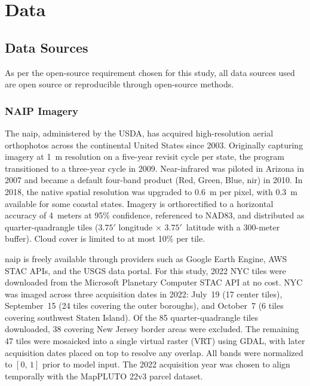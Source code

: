 \chapter{Data}
\label{ch:data}

\section{Data Sources}
\label{sec:data_sources}

As per the open-source requirement chosen for this study, all data sources used are open source or reproducible through open-source methods.

\subsection{NAIP Imagery}
\label{sec:naip}

The \acrfull{naip}, administered by the USDA, has acquired high-resolution aerial orthophotos across the continental United States since 2003. Originally capturing imagery at 1~m resolution on a five-year revisit cycle per state, the program transitioned to a three-year cycle in 2009. Near-infrared was piloted in Arizona in 2007 and became a default four-band product (Red, Green, Blue, \acrshort{nir}) in 2010. In 2018, the native spatial resolution was upgraded to 0.6~m per pixel, with 0.3~m available for some coastal states. Imagery is orthorectified to a horizontal accuracy of 4~meters at 95\% confidence, referenced to NAD83, and distributed as quarter-quadrangle tiles ($3.75'$ longitude $\times$ $3.75'$\ latitude with a 300-meter buffer). Cloud cover is limited to at most 10\% per tile.

\acrshort{naip} is freely available through providers such as Google Earth Engine, AWS STAC APIs, and the USGS data portal. For this study, 2022 NYC tiles were downloaded from the Microsoft Planetary Computer STAC API at no cost. NYC was imaged across three acquisition dates in 2022: July~19 (17 center tiles), September~15 (24 tiles covering the outer boroughs), and October~7 (6 tiles covering southwest Staten Island). Of the 85 quarter-quadrangle tiles downloaded, 38 covering New Jersey border areas were excluded. The remaining 47 tiles were mosaicked into a single virtual raster (VRT) using GDAL, with later acquisition dates placed on top to resolve any overlap. All bands were normalized to $[0,\,1]$ prior to model input. The 2022 acquisition year was chosen to align temporally with the MapPLUTO 22v3 parcel dataset.

